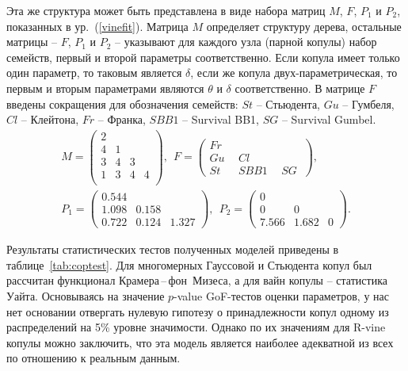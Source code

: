 Эта же структура может быть представлена в виде набора матриц $M$, $F$, $P_1$ и $P_2$, показанных в ур.~(\ref{vinefit}). 
Матрица $M$ определяет структуру дерева, остальные матрицы -- $F$, $P_1$ и $P_2$ -- указывают для каждого узла (парной копулы) набор семейств, первый и второй параметры соответственно. 
Если копула имеет только один параметр, то таковым является $\delta$, если же копула двух-параметрическая, то первым и вторым параметрами являются $\theta$ и $\delta$ соответственно.
В матрице $F$ введены сокращения для обозначения семейств: $St$ -- Стьюдента, $Gu$ -- Гумбеля, $Cl$ -- Клейтона, $Fr$ -- Франка, $SBB1$ -- Survival BB1, $SG$ -- Survival Gumbel.
%
\begin{gather} \label{vinefit}
    M = \left(
        \begin{array}{cccc}
        2 &   &   &   \\
        4 & 1 &   &   \\
        3 & 4 & 3 &   \\
        1 & 3 & 4 & 4 \\
        \end{array} \right), \ \
    F = \left(
        \begin{array}{lll}%
        Fr\ &\  &    \\
        Gu\ &\ Cl\ &   \\
        St\ &\ SBB1\ &\ SG\
        \end{array} \right),\\    
    P_1 = \left(
        \begin{array}{ccc}
        0.544 & & \\
        1.098 & 0.158 & \\
        0.722 & 0.124 & 1.327
        \end{array} \right), \ \
    P_2 = \left(
        \begin{array}{ccc}
        0 &  & \\
        0 & 0 & \\
        7.566 & 1.682 & 0
        \end{array} \right). \nonumber
\end{gather}

Результаты статистических тестов полученных моделей приведены в таблице~\ref{tab:coptest}.
Для многомерных Гауссовой и Стьюдента копул был рассчитан функционал Крамера\,--\,фон~Мизеса, а для вайн копулы -- статистика Уайта.
Основываясь на значение $p$-value GoF-тестов оценки параметров, у нас нет основании отвергать нулевую гипотезу о принадлежности копул одному из распределений на 5\% уровне значимости.
Однако по их значениям для R-vine копулы можно заключить, что эта модель является наиболее адекватной из всех по отношению к реальным данным.

